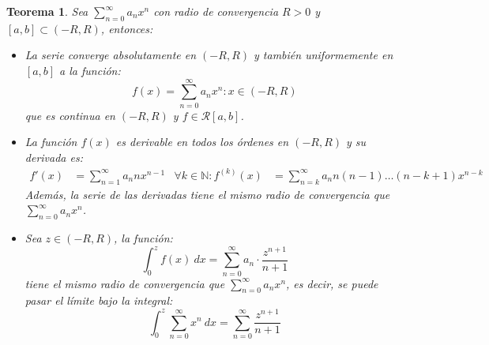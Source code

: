 \documentclass[10pt,a4paper,openright]{book}
\theoremstyle{break}
\newtheorem*{theo}{Teorema}
\newcommand{\dif}[1]{\ d#1}
\begin{document}
\begin{theo}
Sea $\sum_{n=0}^{\infty} a_n x^n$ con radio de convergencia $R>0$ y $[a,b] \subset (-R, R)$, entonces:
\begin{itemize}
\item La serie converge absolutamente en $(-R, R)$ y también uniformemente en $[a,b]$ a la función:
$$f(x) = \sum_{n=0}^{\infty} a_n x^n : x \in (-R, R) $$
que es continua en $(-R, R)$ y $f \in \mathcal{R}[a,b]$.

\item La función $f(x)$ es derivable en todos los órdenes en $(-R, R)$ y su derivada es:
\begin{align*}
f'(x) & = \sum_{n=1}^{\infty} a_n n x^{n-1} & \forall k \in \mathbb{N}: f^{(k)}(x) & = \sum_{n = k}^{\infty} a_n n (n-1) \ldots (n- k + 1) x^{n-k}
\end{align*}
Además, la serie de las derivadas tiene el mismo radio de convergencia que $\sum_{n=0}^{\infty} a_n x^n$.

\item Sea $z \in (-R,R)$, la función:
$$\int_{0}^{z} f(x) \dif{x} = \sum_{n=0}^{\infty} a_n \cdot \frac{z^{n+1}}{n+1}$$
tiene el mismo radio de convergencia que $\sum_{n=0}^{\infty} a_n x^n$, es decir, se puede pasar el límite bajo la integral:
$$\int_{0}^{z} \sum_{n= 0}^{\infty} x^n \dif{x} = \sum_{n=0}^{\infty} \frac{z^{n+1}}{n+1}$$
\end{itemize}
\end{theo}
\end{document}
